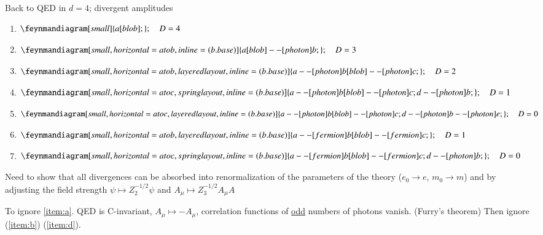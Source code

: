 Back to QED in $d=4$; divergent amplitudes
\begin{enumerate}[label=(\alph*)]
	\item \label{item:a} $\begin{aligned}[t]\feynmandiagram[small]{a[blob];}; \quad D &=4 \end{aligned}$
   \item \label{item:b} $\begin{aligned}[t]\feynmandiagram[small, horizontal=a to b, inline=(b.base)]{a[blob] --[photon] b;}; \quad D &=3\end{aligned}$
	\item \label{item:c}$\begin{aligned}[t]\feynmandiagram[small, horizontal=a to b, layered layout, inline=(b.base)]{a --[photon] b[blob] --[photon] c;}; \quad D &=2\end{aligned}$
	\item \label{item:d}$\begin{aligned}[t]\feynmandiagram[small, horizontal=a to c, spring layout, inline=(b.base)]{a --[photon] b[blob] --[photon] c; d --[photon] b;}; \quad D &=1\end{aligned}$
   \item \label{item:e}$\begin{aligned}[t]\feynmandiagram[small, horizontal=a to c, layered layout, inline=(b.base)]{a --[photon] b[blob] --[photon] c; d --[photon] b --[photon] e;}; \quad D &=0\end{aligned}$
	\item \label{item:f}$\begin{aligned}[t]\feynmandiagram[small, horizontal=a to b, layered layout, inline=(b.base)]{a --[fermion] b[blob] --[fermion] c;}; \quad D &=1\end{aligned}$
	\item \label{item:g}$\begin{aligned}[t]\feynmandiagram[small, horizontal=a to c, spring layout, inline=(b.base)]{a --[fermion] b[blob] --[fermion] c; d --[photon] b;}; \quad D &=0 \end{aligned}$
\end{enumerate}

Need to show that all divergences can be absorbed into renormalization of the parameters of the theory ($e_0 \rightarrow e$, $m_0 \rightarrow m $) and by adjusting the field strength $\psi \mapsto Z_2^{-1/2} \psi$ and $A_\mu \mapsto Z_3^{-1/2}A_\mu A$

To ignore \ref{item:a}. QED is $\mathrm{C}$-invariant, $A_\mu \mapsto -A_\mu$, correlation functions of \underline{odd} numbers of photons vanish. (Furry's theorem) Then ignore (\ref{item:b}) (\ref{item:d}).

